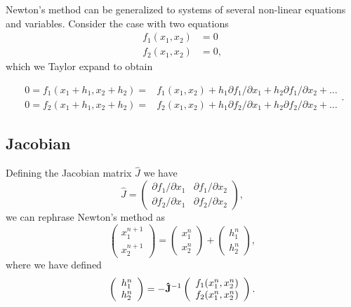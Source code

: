 \documentclass[%
oneside,                 %
final,                   %
10pt]{article}
\begin{document}
Newton's method can be generalized to systems of several non-linear equations
and variables. Consider the case with two equations
\[
   \begin{array}{cc} f_1(x_1,x_2) &=0\\
                     f_2(x_1,x_2) &=0,\end{array}
\]
which we Taylor expand to obtain

\[
   \begin{array}{cc} 0=f_1(x_1+h_1,x_2+h_2)=&f_1(x_1,x_2)+h_1
                     \partial f_1/\partial x_1+h_2
                     \partial f_1/\partial x_2+\dots\\
                     0=f_2(x_1+h_1,x_2+h_2)=&f_2(x_1,x_2)+h_1
                     \partial f_2/\partial x_1+h_2
                     \partial f_2/\partial x_2+\dots
                       \end{array}.
\]

\subsection*{Jacobian}
Defining the Jacobian matrix $\hat{J}$ we have
\[
 \hat{J}=\left( \begin{array}{cc}
                         \partial f_1/\partial x_1  & \partial f_1/\partial x_2 \\
                          \partial f_2/\partial x_1     &\partial f_2/\partial x_2
             \end{array} \right),
\]
we can rephrase Newton's method as
\[
\left(\begin{array}{c} x_1^{n+1} \\ x_2^{n+1} \end{array} \right)=
\left(\begin{array}{c} x_1^{n} \\ x_2^{n} \end{array} \right)+
\left(\begin{array}{c} h_1^{n} \\ h_2^{n} \end{array} \right),
\]
where we have defined
\[
   \left(\begin{array}{c} h_1^{n} \\ h_2^{n} \end{array} \right)=
   -{\bf \hat{J}}^{-1}
   \left(\begin{array}{c} f_1(x_1^{n},x_2^{n}) \\ f_2(x_1^{n},x_2^{n}) \end{array} \right).
\]
\end{document}
